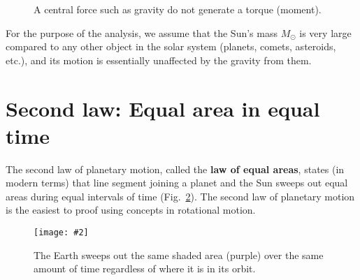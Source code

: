 \documentclass{../../oss-handout}
\newcommand{\pic}[2]{\texttt{[image: \#2]}}
\begin{document}
\begin{figure}[!ht]
  \centering
  \caption{A central force such as gravity do not generate a torque (moment).}
  \label{central-force}
\end{figure}
For the purpose of the analysis, we assume that the Sun's mass $M_\odot$
is very large compared to any other object in the solar system (planets,
comets, asteroids, etc.), and its motion is essentially unaffected by the
gravity from them.

\section{Second law: Equal area in equal time}

The second law of planetary motion, called the \textbf{law of equal areas},
states (in modern terms) that line segment joining a planet and the Sun sweeps
out equal areas during equal intervals of time (Fig.~\ref{kep2}). The second
law of planetary motion is the easiest to proof using concepts in rotational
motion.
\begin{figure}[!ht]
  \centering
    \pic{.4}{../201532-132212364-3243-planet}
    \caption{The Earth sweeps out the same shaded area (purple) over the
      same amount of time regardless of where it is in its orbit.}
    \label{kep2}
\end{figure}
\end{document}
